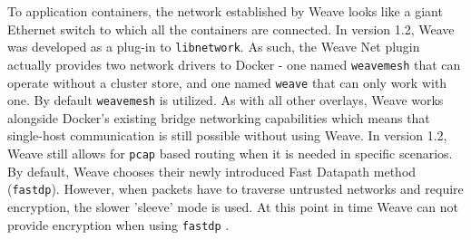 To application containers, the network established by Weave looks like a giant Ethernet switch to which all the containers are connected. In version 1.2, Weave was developed as a plug-in to \texttt{libnetwork}. As such, the Weave Net plugin actually provides two network drivers to Docker - one named \texttt{weavemesh} that can operate without a cluster store, and one named \texttt{weave} that can only work with one. By default \texttt{weavemesh} is utilized. As with all other overlays, Weave works alongside Docker's existing bridge networking capabilities which means that single-host communication is still possible without using Weave. In version 1.2, Weave still allows for \texttt{pcap} based routing when it is needed in specific scenarios. By default, Weave chooses their newly introduced Fast Datapath method (\texttt{fastdp}). However, when packets have to traverse untrusted networks and require encryption, the slower 'sleeve’ mode is used. At this point in time Weave can not provide encryption when using \texttt{fastdp} \cite{9_wragg_2015}.






